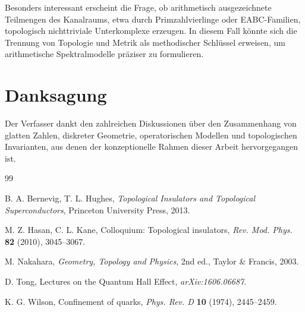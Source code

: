 \documentclass[11pt,a4paper]{article}
\theoremstyle{remark}
\begin{document}
	Besonders interessant erscheint die Frage, ob arithmetisch ausgezeichnete Teilmengen des Kanalraums, etwa durch Primzahlvierlinge oder EABC-Familien, topologisch nichttriviale Unterkomplexe erzeugen. In diesem Fall könnte sich die Trennung von Topologie und Metrik als methodischer Schlüssel erweisen, um arithmetische Spektralmodelle präziser zu formulieren.
	
	\section*{Danksagung}
	Der Verfasser dankt den zahlreichen Diskussionen über den Zusammenhang von glatten Zahlen, diskreter Geometrie, operatorischen Modellen und topologischen Invarianten, aus denen der konzeptionelle Rahmen dieser Arbeit hervorgegangen ist.
	
	\begin{thebibliography}{99}
		
		B. A. Bernevig, T. L. Hughes,
		\emph{Topological Insulators and Topological Superconductors},
		Princeton University Press, 2013.
		
		M. Z. Hasan, C. L. Kane,
		Colloquium: Topological insulators,
		\emph{Rev. Mod. Phys.} \textbf{82} (2010), 3045--3067.
		
		M. Nakahara,
		\emph{Geometry, Topology and Physics},
		2nd ed., Taylor \& Francis, 2003.
		
		D. Tong,
		Lectures on the Quantum Hall Effect,
		\emph{arXiv:1606.06687}.
		
		K. G. Wilson,
		Confinement of quarks,
		\emph{Phys. Rev. D} \textbf{10} (1974), 2445--2459.
		
	\end{thebibliography}
	
\end{document}
